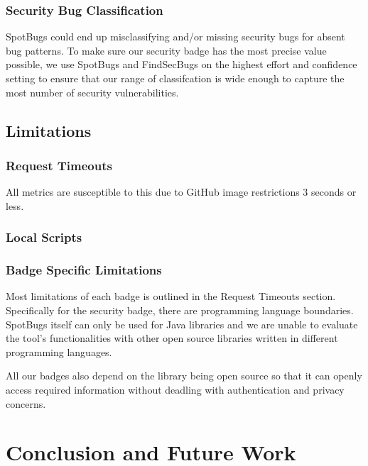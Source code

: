 \documentclass[12pt, letterpaper]{article}
\begin{document}
\subsubsection{Security Bug Classification}
SpotBugs \cite{spotbugs} could end up misclassifying and/or missing security bugs for absent bug patterns.
To make sure our security badge has the most precise value possible, we use SpotBugs \cite{spotbugs}
and FindSecBugs \cite{findsecbugs} on the highest effort and confidence setting to ensure that 
our range of classifcation is wide enough to capture the most number of security vulnerabilities.


\subsection{Limitations}
\subsubsection{Request Timeouts}
All metrics are susceptible to this due to GitHub image restrictions  3 seconds or less. 

\subsubsection{Local Scripts}

\subsubsection{Badge Specific Limitations}
Most limitations of each badge is outlined in the Request Timeouts section.
Specifically for the security badge, there are programming language boundaries.
SpotBugs \cite{spotbugs} itself can only be used for Java libraries and we are 
unable to evaluate the tool's functionalities with other open source libraries written
in different programming languages.


All our badges also depend on the library being open source so that it can openly
access required information without deadling with authentication and privacy concerns.


\section{Conclusion and Future Work}


\newpage


\end{document}
